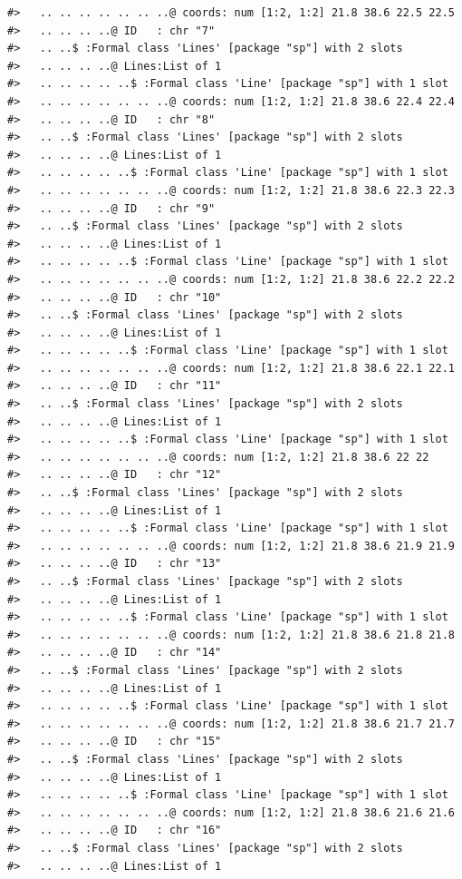 \documentclass[12pt,a4paper,a4paper]{book}
\theoremstyle{definition}
\theoremstyle{definition}
\theoremstyle{definition}
\theoremstyle{remark}
\begin{document}
\begin{verbatim}
#>   .. .. .. .. .. .. ..@ coords: num [1:2, 1:2] 21.8 38.6 22.5 22.5
#>   .. .. .. ..@ ID   : chr "7"
#>   .. ..$ :Formal class 'Lines' [package "sp"] with 2 slots
#>   .. .. .. ..@ Lines:List of 1
#>   .. .. .. .. ..$ :Formal class 'Line' [package "sp"] with 1 slot
#>   .. .. .. .. .. .. ..@ coords: num [1:2, 1:2] 21.8 38.6 22.4 22.4
#>   .. .. .. ..@ ID   : chr "8"
#>   .. ..$ :Formal class 'Lines' [package "sp"] with 2 slots
#>   .. .. .. ..@ Lines:List of 1
#>   .. .. .. .. ..$ :Formal class 'Line' [package "sp"] with 1 slot
#>   .. .. .. .. .. .. ..@ coords: num [1:2, 1:2] 21.8 38.6 22.3 22.3
#>   .. .. .. ..@ ID   : chr "9"
#>   .. ..$ :Formal class 'Lines' [package "sp"] with 2 slots
#>   .. .. .. ..@ Lines:List of 1
#>   .. .. .. .. ..$ :Formal class 'Line' [package "sp"] with 1 slot
#>   .. .. .. .. .. .. ..@ coords: num [1:2, 1:2] 21.8 38.6 22.2 22.2
#>   .. .. .. ..@ ID   : chr "10"
#>   .. ..$ :Formal class 'Lines' [package "sp"] with 2 slots
#>   .. .. .. ..@ Lines:List of 1
#>   .. .. .. .. ..$ :Formal class 'Line' [package "sp"] with 1 slot
#>   .. .. .. .. .. .. ..@ coords: num [1:2, 1:2] 21.8 38.6 22.1 22.1
#>   .. .. .. ..@ ID   : chr "11"
#>   .. ..$ :Formal class 'Lines' [package "sp"] with 2 slots
#>   .. .. .. ..@ Lines:List of 1
#>   .. .. .. .. ..$ :Formal class 'Line' [package "sp"] with 1 slot
#>   .. .. .. .. .. .. ..@ coords: num [1:2, 1:2] 21.8 38.6 22 22
#>   .. .. .. ..@ ID   : chr "12"
#>   .. ..$ :Formal class 'Lines' [package "sp"] with 2 slots
#>   .. .. .. ..@ Lines:List of 1
#>   .. .. .. .. ..$ :Formal class 'Line' [package "sp"] with 1 slot
#>   .. .. .. .. .. .. ..@ coords: num [1:2, 1:2] 21.8 38.6 21.9 21.9
#>   .. .. .. ..@ ID   : chr "13"
#>   .. ..$ :Formal class 'Lines' [package "sp"] with 2 slots
#>   .. .. .. ..@ Lines:List of 1
#>   .. .. .. .. ..$ :Formal class 'Line' [package "sp"] with 1 slot
#>   .. .. .. .. .. .. ..@ coords: num [1:2, 1:2] 21.8 38.6 21.8 21.8
#>   .. .. .. ..@ ID   : chr "14"
#>   .. ..$ :Formal class 'Lines' [package "sp"] with 2 slots
#>   .. .. .. ..@ Lines:List of 1
#>   .. .. .. .. ..$ :Formal class 'Line' [package "sp"] with 1 slot
#>   .. .. .. .. .. .. ..@ coords: num [1:2, 1:2] 21.8 38.6 21.7 21.7
#>   .. .. .. ..@ ID   : chr "15"
#>   .. ..$ :Formal class 'Lines' [package "sp"] with 2 slots
#>   .. .. .. ..@ Lines:List of 1
#>   .. .. .. .. ..$ :Formal class 'Line' [package "sp"] with 1 slot
#>   .. .. .. .. .. .. ..@ coords: num [1:2, 1:2] 21.8 38.6 21.6 21.6
#>   .. .. .. ..@ ID   : chr "16"
#>   .. ..$ :Formal class 'Lines' [package "sp"] with 2 slots
#>   .. .. .. ..@ Lines:List of 1

\end{verbatim}
\end{document}
